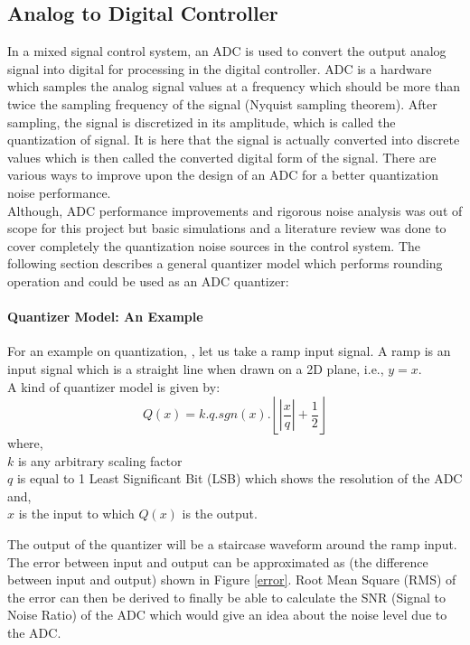 \documentclass[colorlinks=true,pdfstartview=FitV,linkcolor=blue,
            citecolor=red,urlcolor=magenta]{ligodoc}
\begin{document}
	\subsection{Analog to Digital Controller}
	In a mixed signal control system, an ADC is used to convert the output analog signal into digital for processing in the digital controller. ADC is a hardware which samples the analog signal values at a frequency which should be more than twice the sampling frequency of the signal (Nyquist sampling theorem). After sampling, the signal is discretized in its amplitude, which is called the quantization of signal. It is here that the signal is actually converted into discrete values which is then called the converted digital form of the signal. There are various ways to improve upon the design of an ADC for a better quantization noise performance.\\
	
	Although, ADC performance improvements and rigorous noise analysis was out of scope for this project but basic simulations and a literature review was done to cover completely the quantization noise sources in the control system. The following section describes a general quantizer model which performs rounding operation and could be used as an ADC quantizer:
	\paragraph{Quantizer Model: An Example}
 	For an example on quantization, \cite{Quantization}, let us take a ramp input signal. A ramp is an input signal which is a straight line when drawn on a 2D plane, i.e., $y=x$.\\
A kind of quantizer model is given by:
\begin{equation}
Q(x)=k.q.sgn(x).\left\lfloor\left|\frac{x}{q}\right|+\frac{1}{2}\right\rfloor
\end{equation}
 where,\\ $k$ is any arbitrary scaling factor\\
 $q$ is equal to 1 Least Significant Bit (LSB) which shows the resolution of the ADC
 and, \\
 $x$ is the input to which $Q(x)$ is the output.
 
   
The output of the quantizer will be a staircase waveform around the ramp input. 
%
The error between input and output can be approximated as (the difference between input and output) shown in Figure \ref{error}. Root Mean Square (RMS) of the error can then be derived to finally be able to calculate the SNR (Signal to Noise Ratio) of the ADC which would give an idea about the noise level due to the ADC.
\end{document}
